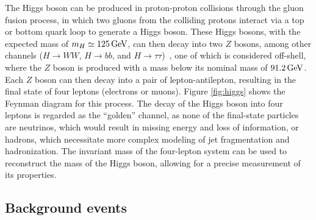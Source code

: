 \documentclass[aps,twocolumn,secnumarabic,balancelastpage,amsmath,amssymb,nofootinbib,floatfix]{revtex4-1}
\newcommand{\GeV}{\,{\rm GeV}}
\begin{document}
The Higgs boson can be produced in proton-proton collisions through the gluon fusion process, in which two gluons from the colliding protons interact via a top or bottom quark loop to generate a Higgs boson. These Higgs bosons, with the expected mass of $m_H \simeq 125\GeV$, can then decay into two $Z$ bosons, among other channels ($H \to WW$, $H \to bb$, and $H \to \tau \tau$)~\citep{Gunion1989}, one of which is considered off-shell, where the $Z$ boson is produced with a mass below its nominal mass of $91.2 \GeV$. Each $Z$ boson can then decay into a pair of lepton-antilepton, resulting in the final state of four leptons (electrons or muons). Figure \ref{fig:higgs} shows the Feynman diagram for this process. The decay of the Higgs boson into four leptons is regarded as the ``golden'' channel, as none of the final-state particles are neutrinos, which would result in missing energy and loss of information, or hadrons, which necessitate more complex modeling of jet fragmentation and hadronization. The invariant mass of the four-lepton system can be used to reconstruct the mass of the Higgs boson, allowing for a precise measurement of its properties.

\subsection{Background events}
\label{ssec:background_theory}
\end{document}
